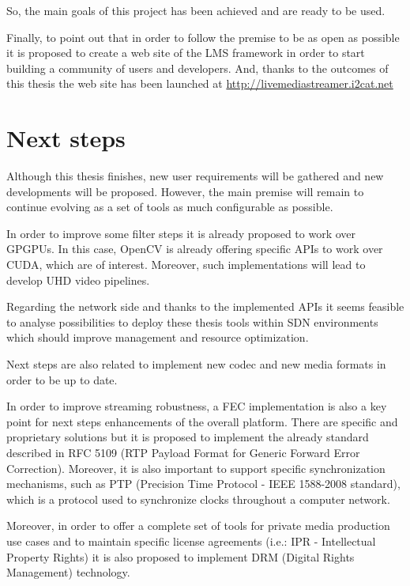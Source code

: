So, the main goals of this project has been achieved and are ready to be used.

Finally, to point out that in order to follow the premise to be as open as possible it is proposed to create a web site of the LMS framework in order to start building a community of users and developers. And, thanks to the outcomes of this thesis the web site has been launched at \href{http://livemediastreamer.i2cat.net}{http://livemediastreamer.i2cat.net}

\section{Next steps}

Although this thesis finishes, new user requirements will be gathered and new developments will be proposed. However, the main premise will remain to continue evolving as a set of tools as much configurable as possible.

In order to improve some filter steps it is already proposed to work over GPGPUs. In this case, OpenCV is already offering specific APIs to work over CUDA, which are of interest. Moreover, such implementations will lead to develop UHD video pipelines.

Regarding the network side and thanks to the implemented APIs it seems feasible to analyse possibilities to deploy these thesis tools within SDN environments which should improve management and resource optimization.

Next steps are also related to implement new codec and new media formats in order to be up to date. 

In order to improve streaming robustness, a FEC implementation is also a key point for next steps enhancements of the overall platform. There are specific and proprietary solutions but it is proposed to implement the already standard described in RFC 5109 (RTP Payload Format for Generic Forward Error Correction). Moreover, it is also important to  support specific synchronization mechanisms, such as PTP (Precision Time Protocol - IEEE 1588-2008 standard), which is a protocol used to synchronize clocks throughout a computer network.

Moreover, in order to offer a complete set of tools for private media production use cases and to maintain specific license agreements (i.e.: IPR - Intellectual Property Rights) it is also proposed to implement DRM (Digital Rights Management) technology.

